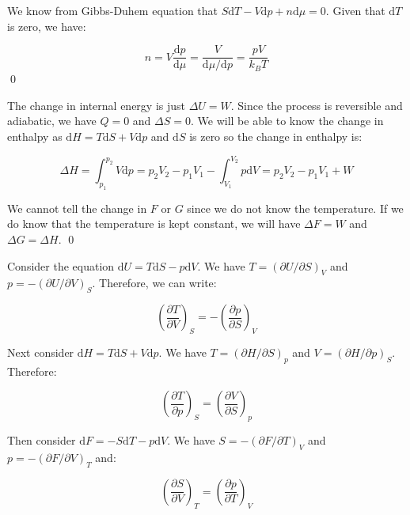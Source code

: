 \documentclass[12pt]{article}
\begin{document}
We know from Gibbs-Duhem equation that $S \mathrm{d}T - V \mathrm{d}p + n \mathrm{d}\mu = 0$. Given that $\mathrm{d}T$ is zero, we have:

\begin{equation}
    n = V \frac{\mathrm{d}p}{\mathrm{d}\mu} = \frac{V}{\mathrm{d}\mu/\mathrm{d}p} = \frac{pV}{k_{B}T}
\end{equation}
\qed


The change in internal energy is just $\Delta U = W$. Since the process is reversible and adiabatic, we have $Q = 0$ and $\Delta S = 0$. We will be able to know the change in enthalpy as $\mathrm{d}H = T \mathrm{d}S + V \mathrm{d}p$ and $\mathrm{d}S$ is zero so the change in enthalpy is:

\begin{equation}
    \Delta H = \int_{p_{1}}^{p_{2}} V \mathrm{d}p = p_{2} V_{2} - p_{1} V_{1} - \int_{V_{1}}^{V_{2}} p \mathrm{d}V = p_{2} V_{2} - p_{1} V_{1} + W
\end{equation}

We cannot tell the change in $F$ or $G$ since we do not know the temperature. If we do know that the temperature is kept constant, we will have $\Delta F = W$ and $\Delta G = \Delta H$.
\qed


Consider the equation $\mathrm{d}U = T \mathrm{d}S - p \mathrm{d}V$. We have $T = (\partial U / \partial S)_{V}$ and $p = -(\partial U / \partial V)_{S}$. Therefore, we can write:

\begin{equation}
   \left(  \frac{\partial T}{\partial V} \right)_{S} = -\left( \frac{\partial p}{\partial S} \right)_{V}
\end{equation}

Next consider $\mathrm{d}H = T \mathrm{d}S + V \mathrm{d}p$. We have $T = (\partial H / \partial S)_{p}$ and $V = (\partial H / \partial p)_{S}$. Therefore:

\begin{equation}
    \left( \frac{\partial T}{\partial p} \right)_{S} = \left( \frac{\partial V}{\partial S} \right)_{p}
\end{equation}

Then consider $\mathrm{d}F = -S \mathrm{d}T - p \mathrm{d}V$. We have $S = -(\partial F / \partial T)_{V}$ and $p = -(\partial F / \partial V)_{T}$ and:

\begin{equation}
    \left( \frac{\partial S}{\partial V} \right)_{T} = \left( \frac{\partial p}{\partial T} \right)_{V}
\end{equation}
\end{document}
